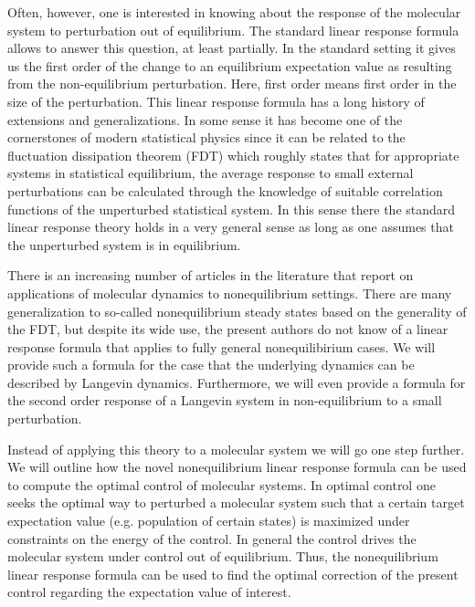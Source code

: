 \documentclass[]{tMPH2e}
\begin{document}
Often, however, one is interested in knowing about the response of the molecular system to perturbation out of equilibrium. The standard linear response formula allows to answer this question, at least partially. In the standard setting it gives us the first order of the change to an equilibrium expectation value as resulting from the non-equilibrium perturbation. Here, first order means first order in the size of the perturbation. This linear response formula has a long history of extensions and generalizations. In some sense it has become one of the cornerstones of modern statistical physics since it can be related to the fluctuation dissipation theorem (FDT) which roughly states that for appropriate systems in statistical equilibrium, the average response to small external perturbations can be calculated through the knowledge of suitable correlation functions of the unperturbed statistical system. In this sense there the standard linear response theory holds in a  very general sense \cite{Majda} as long as one assumes that the unperturbed system is in equilibrium.

There is an increasing number of articles in the literature that report on applications of molecular dynamics to nonequilibrium settings. There are many generalization to so-called nonequilibrium steady states based on the generality of the FDT, but despite its wide use, the present authors do not know of a linear response formula that applies to fully general nonequilibirium cases. We will provide such a formula for the case that the underlying dynamics can be described by Langevin dynamics. Furthermore, we will even provide a formula for the second order response of a Langevin system in non-equilibrium to a small perturbation.

Instead of applying this theory to a molecular system we will go one step further. We will outline how the novel nonequilibrium linear response formula can be used to compute the optimal control of molecular systems. In optimal control one seeks the optimal way to perturbed a molecular system such that a certain target expectation value (e.g. population of certain states) is maximized under constraints on the energy of the control. In general the control drives the molecular system under control out of equilibrium. Thus, the nonequilibrium linear response formula can be used to find the optimal correction of the present control regarding the expectation value of interest. 
\end{document}

